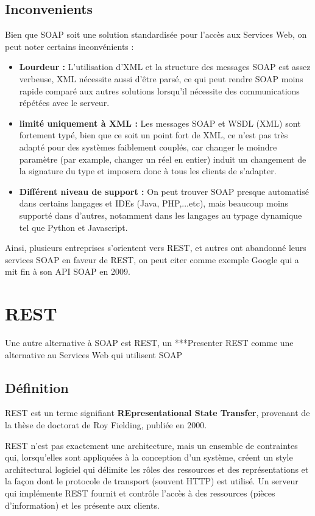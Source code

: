 			\subsection{Inconvenients}
				Bien que SOAP soit une solution standardisée pour l'accès aux Services Web, on peut noter certains inconvénients :
				\begin{itemize}
				\item \textbf{Lourdeur :} L'utilisation d'XML et la structure des messages SOAP est assez verbeuse, XML nécessite aussi d'être parsé, ce qui peut rendre SOAP moins rapide comparé aux autres solutions lorsqu'il nécessite des communications répétées avec le serveur.
				\item \textbf{limité uniquement à XML :} Les messages SOAP et WSDL (XML) sont fortement typé, bien que ce soit un point fort de XML, ce n'est pas très adapté pour des systèmes faiblement couplés, car changer le moindre paramètre (par example, changer un réel en entier) induit un changement de la signature du type et imposera donc à tous les clients de s'adapter.
				\item \textbf{Différent niveau de support :} On peut trouver SOAP presque automatisé dans certains langages et IDEs (Java, PHP,...etc), mais beaucoup moins supporté dans d'autres, notamment dans les langages au typage dynamique tel que Python et Javascript.
				\end{itemize}
				
	Ainsi, plusieurs entreprises s'orientent vers REST, et autres ont abandonné leurs services SOAP en faveur de REST, on peut citer comme exemple Google qui a mit fin à son API SOAP en 2009.
		\newpage

		\section{REST}
		Une autre alternative à SOAP est REST, un
		***Presenter REST comme une alternative au Services Web qui utilisent SOAP
		\subsection{Définition}
				REST est un terme signifiant \textbf{REpresentational State Transfer}, provenant de la thèse de doctorat de Roy Fielding, publiée en 2000.
				
				REST n'est pas exactement une architecture, mais un ensemble de contraintes qui, lorsqu'elles sont appliquées à la conception d'un système, créent un style architectural logiciel qui délimite les rôles des ressources et des représentations et la façon dont le protocole de transport (souvent HTTP) est utilisé. 
				Un serveur qui implémente REST fournit et contrôle l'accès à des ressources (pièces d'information) et les présente aux clients.
			
